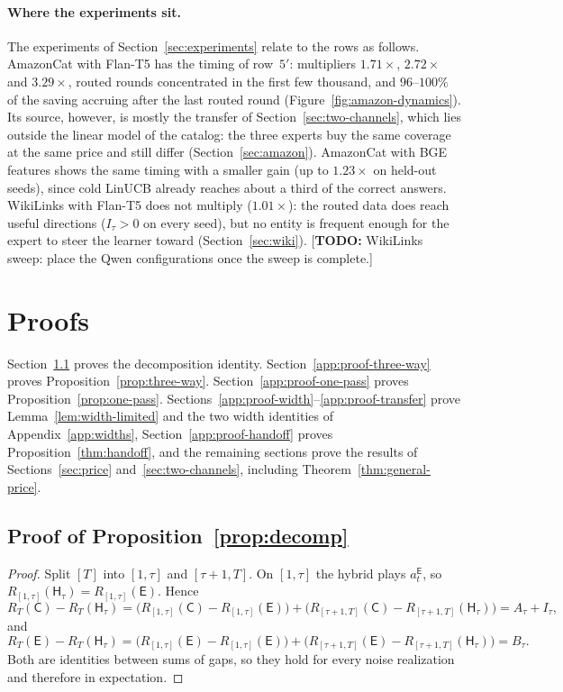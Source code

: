 \documentclass[anon]{alt2027} %
\newcommand{\todo}[1]{\textcolor{red!70!black}{[\textbf{TODO:} #1]}}
\newcommand{\Cold}{\mathsf{C}}
\newcommand{\Exp}{\mathsf{E}}
\newcommand{\Hyb}{\mathsf{H}}
\begin{document}
\paragraph{Where the experiments sit.}
The experiments of Section~\ref{sec:experiments} relate to the rows as
follows. AmazonCat with Flan-T5 has the timing of row~$5'$: multipliers
$1.71\times$, $2.72\times$ and $3.29\times$, routed rounds concentrated in the
first few thousand, and $96$--$100\%$ of the saving accruing after the last
routed round (Figure~\ref{fig:amazon-dynamics}). Its source, however, is
mostly the transfer of Section~\ref{sec:two-channels}, which lies outside the
linear model of the catalog: the three experts buy the same coverage at the
same price and still differ (Section~\ref{sec:amazon}). AmazonCat with BGE
features shows the same timing with a smaller gain (up to $1.23\times$ on
held-out seeds), since cold LinUCB already reaches about a third of the
correct answers. WikiLinks with Flan-T5 does not multiply ($1.01\times$): the
routed data does reach useful directions ($I_\tau>0$ on every seed), but no
entity is frequent enough for the expert to steer the learner toward
(Section~\ref{sec:wiki}). \todo{WikiLinks sweep: place the Qwen
configurations once the sweep is complete.}

\section{Proofs}
\label{app:proofs}

Section~\ref{app:proof-decomp} proves the decomposition identity.
Section~\ref{app:proof-three-way} proves
Proposition~\ref{prop:three-way}.
Section~\ref{app:proof-one-pass} proves Proposition~\ref{prop:one-pass}.
Sections~\ref{app:proof-width}--\ref{app:proof-transfer} prove
Lemma~\ref{lem:width-limited} and the two width identities of
Appendix~\ref{app:widths}, Section~\ref{app:proof-handoff} proves
Proposition~\ref{thm:handoff}, and the remaining sections prove the results of
Sections~\ref{sec:price} and~\ref{sec:two-channels}, including
Theorem~\ref{thm:general-price}.

\subsection{Proof of Proposition~\ref{prop:decomp}}
\label{app:proof-decomp}

\begin{proof}
Split $[T]$ into $[1,\tau]$ and $[\tau+1,T]$. On $[1,\tau]$ the hybrid plays
$a_t^{\Exp}$, so $R_{[1,\tau]}(\Hyb_\tau)=R_{[1,\tau]}(\Exp)$. Hence
\[
R_T(\Cold)-R_T(\Hyb_\tau)
=\bigl(R_{[1,\tau]}(\Cold)-R_{[1,\tau]}(\Exp)\bigr)
+\bigl(R_{[\tau+1,T]}(\Cold)-R_{[\tau+1,T]}(\Hyb_\tau)\bigr)
=A_\tau+I_\tau ,
\]
and
\[
R_T(\Exp)-R_T(\Hyb_\tau)
=\bigl(R_{[1,\tau]}(\Exp)-R_{[1,\tau]}(\Exp)\bigr)
+\bigl(R_{[\tau+1,T]}(\Exp)-R_{[\tau+1,T]}(\Hyb_\tau)\bigr)
=B_\tau .
\]
Both are identities between sums of gaps, so they hold for every noise
realization and therefore in expectation.
\end{proof}
\end{document}
